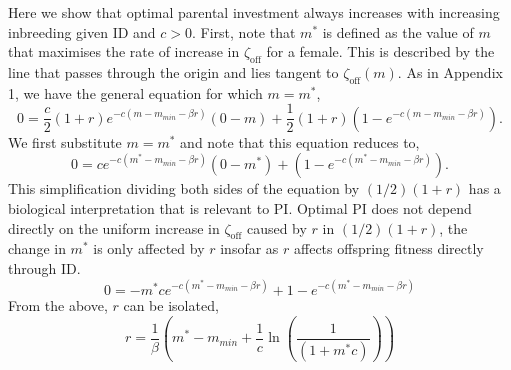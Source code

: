 \documentclass[12pt]{article}
\begin{document}
Here we show that optimal parental investment always increases with increasing inbreeding given ID and $c>0$. First, note that $m^{*}$ is defined as the value of $m$ that maximises the rate of increase in $\zeta_{\textrm{off}}$ for a female. This is described by the line that passes through the origin and lies tangent to $\zeta_{\textrm{off}}(m)$. As in Appendix 1, we have the general equation for which $m=m^{*}$,
\begin{equation}
0 = \frac{c}{2} \left(1+r\right)e^{-c\left(m-m_{min}-\beta r\right)}\left(0-m\right) + \frac{1}{2}\left(1+r\right)\left(1-e^{-c\left(m-m_{min}-\beta r\right)}\right).
\end{equation}
We first substitute $m=m^{*}$ and note that this equation reduces to,
\begin{equation}
0 = c e^{-c\left(m^{*}-m_{min}-\beta r\right)}\left(0-m^{*}\right) + \left(1-e^{-c\left(m^{*}-m_{min}-\beta r\right)}\right). 
\end{equation}
This simplification dividing both sides of the equation by $(1/2)(1+r)$ has a biological interpretation that is relevant to PI. Optimal PI does not depend directly on the uniform increase in $\zeta_{\textrm{off}}$ caused by $r$ in $(1/2)(1+r)$, the change in $m^{*}$ is only affected by $r$ insofar as $r$ affects offspring fitness directly through ID. %
\begin{equation}
0 = -m^{*} c e^{-c\left(m^{*}-m_{min}-\beta r\right)} + 1-e^{-c\left(m^{*}-m_{min}-\beta r\right)}
\end{equation}
From the above, $r$ can be isolated,
\begin{equation}
r = \frac{1}{\beta}\left(m^{*} - m_{min} + \frac{1}{c}\ln\left(\frac{1}{\left(1 + m^{*} c\right)}\right)\right)
\end{equation}
\end{document}
